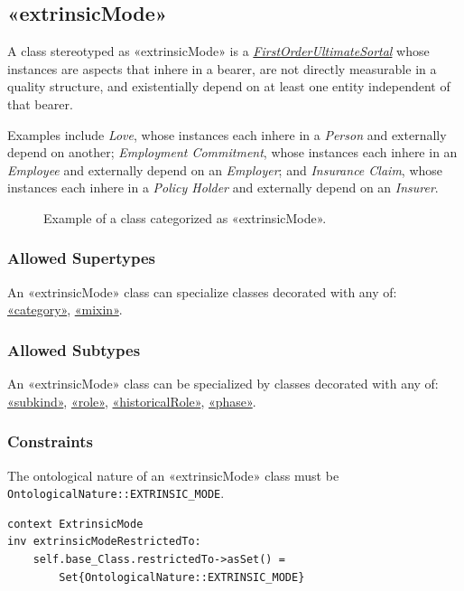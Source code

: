 \subsection{«extrinsicMode»}
\label{stereotype:extrinsicMode}

A class stereotyped as «extrinsicMode» is a \hyperref[stereotype:firstOrderUltimateSortal]{\textit{FirstOrderUltimateSortal}} whose instances are aspects that inhere in a bearer, are not directly measurable in a quality structure, and existentially depend on at least one entity independent of that bearer.

Examples include \textit{Love}, whose instances each inhere in a \textit{Person} and externally depend on another; \textit{Employment Commitment}, whose instances each inhere in an \textit{Employee} and externally depend on an \textit{Employer}; and \textit{Insurance Claim}, whose instances each inhere in a \textit{Policy Holder} and externally depend on an \textit{Insurer}.

\begin{figure}[h]
    \centering
    
    \caption{Example of a class categorized as «extrinsicMode».}
    \label{fig:extrinsicMode-example}
\end{figure}

\subsubsection{Allowed Supertypes}

An «extrinsicMode» class can specialize classes decorated with any of:
\hyperref[stereotype:category]{«category»}, \hyperref[stereotype:mixin]{«mixin»}.

\subsubsection{Allowed Subtypes}

An «extrinsicMode» class can be specialized by classes decorated with any of:
\hyperref[stereotype:subkind]{«subkind»}, \hyperref[stereotype:role]{«role»}, \hyperref[stereotype:historicalRole]{«historicalRole»}, \hyperref[stereotype:phase]{«phase»}.

\subsubsection{Constraints}

\begin{constraint}
\label{extrinsicModeRestrictedTo}
The ontological nature of an «extrinsicMode» class must be \texttt{OntologicalNature::EXTRINSIC\_MODE}.

\begin{lstlisting}[language=OCL]
context ExtrinsicMode
inv extrinsicModeRestrictedTo:
    self.base_Class.restrictedTo->asSet() =
        Set{OntologicalNature::EXTRINSIC_MODE}
\end{lstlisting}
\end{constraint}


